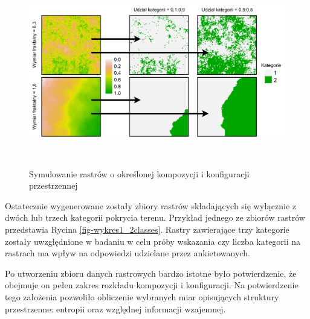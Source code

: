 \documentclass{amuthesis}
\begin{document}
\begin{figure}[t]

{\centering \includegraphics[width=1\textwidth,height=3.22917in]{figures/diagram_rastersim_showcase.pdf}

}

\caption{\label{fig-diagram-symulowanie}Symulowanie rastrów o określonej
kompozycji i konfiguracji przestrzennej}

\end{figure}

Ostatecznie wygenerowane zostały zbiory rastrów składających się
wyłącznie z dwóch lub trzech kategorii pokrycia terenu. Przykład jednego
ze zbiorów rastrów przedstawia Rycina \ref{fig-wykres1_2classes}. Rastry
zawierające trzy kategorie zostały uwzględnione w badaniu w celu próby
wskazania czy liczba kategorii na rastrach ma wpływ na odpowiedzi
udzielane przez ankietowanych.

Po utworzeniu zbioru danych rastrowych bardzo istotne było
potwierdzenie, że obejmuje on pełen zakres rozkładu kompozycji i
konfiguracji. Na potwierdzenie tego założenia pozwoliło obliczenie
wybranych miar opisujących struktury przestrzenne: entropii oraz
względnej informacji wzajemnej.
\end{document}

